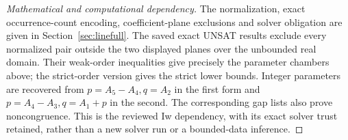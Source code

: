 \begin{proof}[Mathematical and computational dependency]
The normalization, exact occurrence-count encoding, coefficient-plane
exclusions and solver obligation are given in Section~\ref{sec:linefull}.
The saved exact UNSAT results exclude every normalized pair outside the
two displayed planes over the unbounded real domain. Their weak-order
inequalities give precisely the parameter chambers above; the strict-order
version gives the strict lower bounds. Integer parameters are recovered
from $p=A_5-A_4,q=A_2$ in the first form and
$p=A_4-A_3,q=A_1+p$ in the second. The corresponding gap lists also prove
noncongruence. This is the reviewed Iw dependency, with its exact solver
trust retained, rather than a new solver run or a bounded-data inference.
\end{proof}


